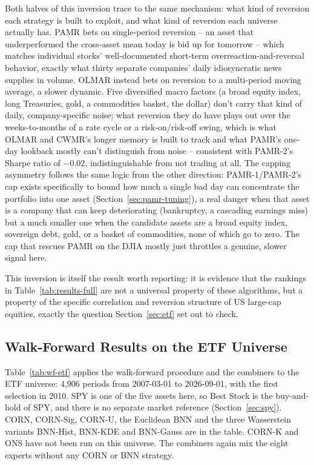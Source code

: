 \documentclass[11pt]{article}
\begin{document}
Both halves of this inversion trace to the same mechanism: what kind of
reversion each strategy is built to exploit, and what kind of reversion
each universe actually has. PAMR bets on single-period reversion -- an
asset that underperformed the cross-asset mean today is bid up for
tomorrow -- which matches individual stocks' well-documented short-term
overreaction-and-reversal behavior, exactly what thirty separate
companies' daily idiosyncratic news supplies in volume. OLMAR instead
bets on reversion to a multi-period moving average, a slower dynamic.
Five diversified macro factors (a broad equity index, long Treasuries,
gold, a commodities basket, the dollar) don't carry that kind of daily,
company-specific noise; what reversion they do have plays out over the
weeks-to-months of a rate cycle or a risk-on/risk-off swing, which is
what OLMAR and CWMR's longer memory is built to track and what PAMR's
one-day lookback mostly can't distinguish from noise -- consistent with
PAMR-2's Sharpe ratio of $-0.02$, indistinguishable from not trading at
all. The capping asymmetry follows the same logic from the other
direction: PAMR-1/PAMR-2's cap exists specifically to bound how much a
single bad day can concentrate the portfolio into one asset
(Section~\ref{sec:pamr-tuning}), a real danger when that asset is a
company that can keep deteriorating (bankruptcy, a cascading earnings
miss) but a much smaller one when the candidate assets are a broad
equity index, sovereign debt, gold, or a basket of commodities, none of
which go to zero. The cap that rescues PAMR on the DJIA mostly just
throttles a genuine, slower signal here.

This inversion is itself the result worth reporting: it is evidence
that the rankings in Table~\ref{tab:results-full} are not a universal
property of these algorithms, but a property of the specific
correlation and reversion structure of US large-cap equities, exactly
the question Section~\ref{sec:etf} set out to check.

\subsection{Walk-Forward Results on the ETF Universe}
\label{sec:wf-etf}

Table~\ref{tab:wf-etf} applies the walk-forward procedure and the
combiners to the ETF universe: 4,906 periods from 2007-03-01 to
2026-09-01, with the first selection in 2010. SPY is one of the five
assets here, so Best Stock is the buy-and-hold of SPY, and there is no
separate market reference (Section~\ref{sec:spy}). CORN, CORN-Sig, CORN-U, the Euclidean BNN and the
three Wasserstein variants BNN-Hist, BNN-KDE and BNN-Gauss are in the table.
CORN-K and ONS have not been run on this universe. The combiners again mix
the eight experts without any CORN or BNN strategy.
\end{document}
